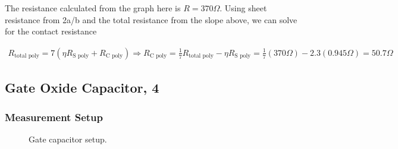 \documentclass{article}
\begin{document}
The resistance calculated from the graph here is $R = 370 \Omega$. Using sheet resistance from 2a/b and the total resistance from the slope above, we can solve for the contact resistance

\begin{align*}
R_{\text{total poly}} = 7(\eta R_{\text{S poly}} + R_{\text{C poly}}) \Rightarrow R_{\text{C poly}} = \frac{1}{7}R_{\text{total poly}} - \eta R_{\text{S poly}} = \frac{1}{7}(370 \Omega) - 2.3(0.945 \Omega) = 50.7 \Omega
\end{align*}


\subsection{Gate Oxide Capacitor, 4} %

\subsubsection{Measurement Setup}
\begin{figure}[H]
\centering
{}
\caption{Gate capacitor setup.}
\end{figure}
\end{document}

